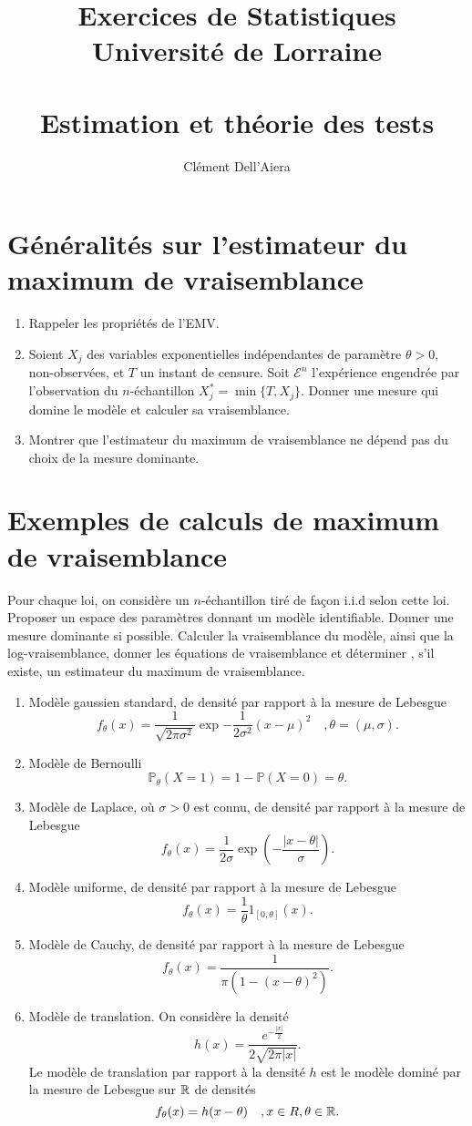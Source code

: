 \documentclass[a4paper]{article}
\title{Exercices de Statistiques  \\ Université de Lorraine \\ ~ \\
\textbf{Estimation et théorie des tests}}
\date{} %
\author{ Clément Dell'Aiera }
\begin{document}
  
\maketitle

\section{Généralités sur l'estimateur du maximum de vraisemblance}
\begin{enumerate}
\item Rappeler les propriétés de l'EMV.
\item Soient $X_j$ des variables exponentielles indépendantes de paramètre $\theta>0$, non-observées, et $T$ un instant de censure. Soit $\mathcal E^n$ l'expérience engendrée par l'observation du $n$-échantillon $X_j^*=\min{\{T,X_j\}}$. Donner une mesure qui domine le modèle et calculer sa vraisemblance.
\item Montrer que l'estimateur du maximum de vraisemblance ne dépend pas du choix de la mesure dominante.  
\end{enumerate}
\section{Exemples de calculs de maximum de vraisemblance}

Pour chaque loi, on considère un $n$-échantillon tiré de façon i.i.d selon cette loi. Proposer un espace des paramètres donnant un modèle identifiable. Donner une mesure dominante si possible. Calculer la vraisemblance du modèle, ainsi que la log-vraisemblance, donner les équations de vraisemblance et déterminer , s'il existe, un estimateur du maximum de vraisemblance.\\

\begin{enumerate}
\item Modèle gaussien standard, de densité par rapport à la mesure de Lebesgue \[f_\theta(x)=\frac{1}{\sqrt{2\pi \sigma^2}} \exp{-\frac{1}{2\sigma^2}}(x-\mu)^2\quad, \theta=(\mu,\sigma).\]
\item Modèle de Bernoulli \[\mathbb P_\theta(X=1)=1-\mathbb P(X=0)=\theta.\]
\item Modèle de Laplace, où $\sigma>0$ est connu, de densité par rapport à la mesure de Lebesgue \[f_\theta(x)=\frac{1}{2\sigma}\exp{(-\frac{|x-\theta|}{\sigma})}.\]
\item Modèle uniforme, de densité par rapport à la mesure de Lebesgue \[f_\theta(x)=\frac{1}{\theta}1_{[0,\theta]}(x).\]
\item Modèle de Cauchy, de densité par rapport à la mesure de Lebesgue \[f_\theta(x)=\frac{1}{\pi(1-(x-\theta)^2)}.\]
\item Modèle de translation. On considère la densité \[h(x)=\frac{ e^{-\frac{|x|}{2}}}{2\sqrt{2\pi|x|}}.\] Le modèle de translation par rapport à la densité $h$ est le modèle dominé par la mesure de Lebesgue sur $\mathbb R$ de densités 
\[f_\theta(x)=h(x-\theta)\quad, x\in R,\theta \in \mathbb R.\]
\end{enumerate}
\end{document}
